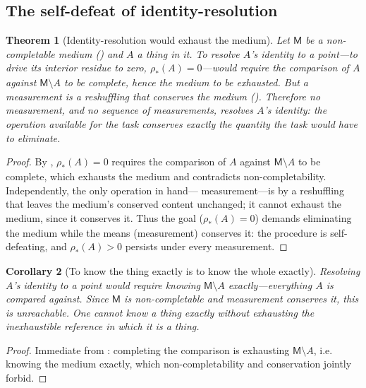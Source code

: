 \documentclass[11pt,a4paper]{article}
\theoremstyle{thmstyle}
\newtheorem{theorem}{Theorem}[section]
\newtheorem{corollary}[theorem]{Corollary}
\theoremstyle{definition}
\theoremstyle{remark}
\newcommand{\med}{\mathsf{M}}             %
\newcommand{\idres}{\rho_{\!*}}            %
\begin{document}
\subsection{The self-defeat of identity-resolution}

\begin{theorem}[Identity-resolution would exhaust the medium]
\label{thm:self-defeat}
Let $\med$ be a non-completable medium \textup{(}\textup{)}
and $A$ a thing in it. To resolve $A$'s identity to a point---to drive its
interior residue to zero, $\idres(A)=0$---would require the comparison of $A$
against $\med\setminus A$ to be complete, hence the medium to be exhausted. But a
measurement is a reshuffling that conserves the medium
\textup{(}\textup{)}. Therefore no measurement, and
no sequence of measurements, resolves $A$'s identity: the operation available for
the task conserves exactly the quantity the task would have to eliminate.
\end{theorem}

\begin{proof}
By , $\idres(A)=0$ requires the comparison of $A$
against $\med\setminus A$ to be complete, which exhausts the medium and
contradicts non-completability. Independently, the only operation in hand---
measurement---is by  a reshuffling that leaves the
medium's conserved content unchanged; it cannot exhaust the medium, since it
conserves it. Thus the goal ($\idres(A)=0$) demands eliminating the medium while
the means (measurement) conserves it: the procedure is self-defeating, and
$\idres(A)>0$ persists under every measurement.
\end{proof}

\begin{corollary}[To know the thing exactly is to know the whole exactly]
\label{cor:know-whole}
Resolving $A$'s identity to a point would require knowing $\med\setminus A$
exactly---everything $A$ is compared against. Since $\med$ is non-completable and
measurement conserves it, this is unreachable. One cannot know a thing exactly
without exhausting the inexhaustible reference in which it is a thing.
\end{corollary}

\begin{proof}
Immediate from : completing the comparison is exhausting
$\med\setminus A$, i.e. knowing the medium exactly, which non-completability and
conservation jointly forbid.
\end{proof}
\end{document}
